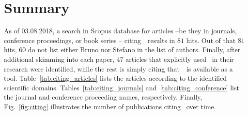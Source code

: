 \documentclass[11pt]{article}
\begin{document}
\Header
\Footer 
\FrontPage

\section*{Summary}

As of 03.08.2018, a search in Scopus database for articles --be they in journals, conference proceedings, or book series -- citing~\uqlab~results in $81$ hits.
Out of that $81$ hits, $60$ do not list either Bruno nor Stefano in the list of authors.
Finally, after additional skimming into each paper, $47$ articles that explicitly used \uqlab~in their research were identified, while the rest is simply citing that~\uqlab~is available as a tool.
Table~\ref{tab:citing_articles} lists the articles according to the identified scientific domains.
Tables~\ref{tab:citing_journals} and~\ref{tab:citing_conference} list the journal and conference proceeding names, respectively.
Finally, Fig.~\ref{fig:citing} illustrates the number of publications citing \uqlab~over time.
\end{document}
